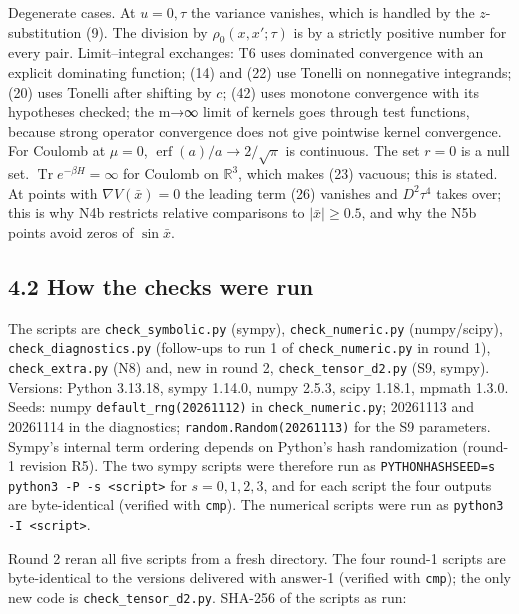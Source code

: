 \documentclass[11pt,a4paper]{article}
\begin{document}
\begin{enumerate}
  Degenerate cases. At \(u=0,\tau\) the variance vanishes, which is handled by the \(z\)-substitution (9). The division by \(\rho_0(x,x';\tau)\) is by a strictly positive number for every pair. Limit--integral exchanges: T6 uses dominated convergence with an explicit dominating function; (14) and (22) use Tonelli on nonnegative integrands; (20) uses Tonelli after shifting by \(c\); (42) uses monotone convergence with its hypotheses checked; the m→∞ limit of kernels goes through test functions, because strong operator convergence does not give pointwise kernel convergence. For Coulomb at \(\mu=0\), \(\operatorname{erf}(a)/a\to2/\sqrt\pi\) is continuous. The set \(r=0\) is a null set. \(\operatorname{Tr}e^{-\beta H}=\infty\) for Coulomb on \(\mathbb R^3\), which makes (23) vacuous; this is stated. At points with \(\nabla V(\bar x)=0\) the leading term (26) vanishes and \(D^2\tau^4\) takes over; this is why N4b restricts relative comparisons to \(|\bar x|\ge0.5\), and why the N5b points avoid zeros of \(\sin\bar x\).
\end{enumerate}

\hypertarget{how-the-checks-were-run}{%
\subsection{4.2 How the checks were run}\label{how-the-checks-were-run}}

The scripts are \texttt{check\_symbolic.py} (sympy), \texttt{check\_numeric.py} (numpy/scipy), \texttt{check\_diagnostics.py} (follow-ups to run 1 of \texttt{check\_numeric.py} in round 1), \texttt{check\_extra.py} (N8) and, new in round 2, \texttt{check\_tensor\_d2.py} (S9, sympy). Versions: Python 3.13.18, sympy 1.14.0, numpy 2.5.3, scipy 1.18.1, mpmath 1.3.0. Seeds: numpy \texttt{default\_rng(20261112)} in \texttt{check\_numeric.py}; 20261113 and 20261114 in the diagnostics; \texttt{random.Random(20261113)} for the S9 parameters. Sympy's internal term ordering depends on Python's hash randomization (round-1 revision R5). The two sympy scripts were therefore run as \texttt{PYTHONHASHSEED=s python3 -P -s <script>} for \(s=0,1,2,3\), and for each script the four outputs are byte-identical (verified with \texttt{cmp}). The numerical scripts were run as \texttt{python3 -I <script>}.

Round 2 reran all five scripts from a fresh directory. The four round-1 scripts are byte-identical to the versions delivered with answer-1 (verified with \texttt{cmp}); the only new code is \texttt{check\_tensor\_d2.py}. SHA-256 of the scripts as run:
\end{document}
